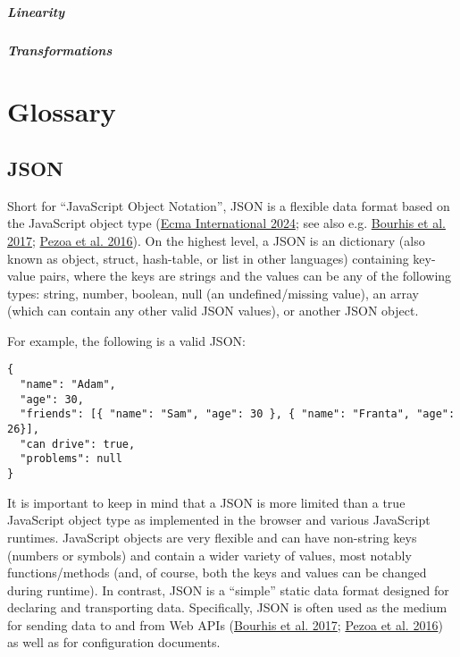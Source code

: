 \documentclass[
]{book}
\begin{document}
\hypertarget{linearity}{%
\paragraph{Linearity}\label{linearity}}

\hypertarget{transformations}{%
\paragraph{Transformations}\label{transformations}}

\hypertarget{section}{%
\section{}\label{section}}

\hypertarget{glossary}{%
\chapter{Glossary}\label{glossary}}

\hypertarget{JSON}{%
\section{JSON}\label{JSON}}

Short for ``JavaScript Object Notation'', JSON is a flexible data format based on the JavaScript object type (\protect\hyperlink{ref-ecma2024}{Ecma International 2024}; see also e.g. \protect\hyperlink{ref-bourhis2017}{Bourhis et al. 2017}; \protect\hyperlink{ref-pezoa2016}{Pezoa et al. 2016}). On the highest level, a JSON is an dictionary (also known as object, struct, hash-table, or list in other languages) containing key-value pairs, where the keys are strings and the values can be any of the following types: string, number, boolean, null (an undefined/missing value), an array (which can contain any other valid JSON values), or another JSON object.

For example, the following is a valid JSON:

\begin{verbatim}
{
  "name": "Adam",
  "age": 30,
  "friends": [{ "name": "Sam", "age": 30 }, { "name": "Franta", "age": 26}],
  "can drive": true,
  "problems": null
}
\end{verbatim}

It is important to keep in mind that a JSON is more limited than a true JavaScript object type as implemented in the browser and various JavaScript runtimes. JavaScript objects are very flexible and can have non-string keys (numbers or symbols) and contain a wider variety of values, most notably functions/methods (and, of course, both the keys and values can be changed during runtime). In contrast, JSON is a ``simple'' static data format designed for declaring and transporting data. Specifically, JSON is often used as the medium for sending data to and from Web APIs (\protect\hyperlink{ref-bourhis2017}{Bourhis et al. 2017}; \protect\hyperlink{ref-pezoa2016}{Pezoa et al. 2016}) as well as for configuration documents.
\end{document}
